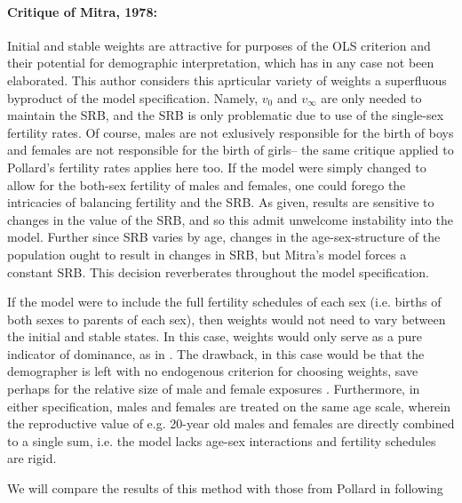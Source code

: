 \paragraph{Critique of Mitra, 1978: } Initial and stable weights are attractive
for purposes of the OLS criterion and their potential for demographic interpretation, which has in any
case not been elaborated. This author considers this aprticular variety of
weights a superfluous byproduct of the model specification. Namely, $v_0$ and
$v_\infty$ are only needed to maintain the SRB, and the SRB is
only problematic due to use of the single-sex fertility rates. Of course, males
are not exlusively responsible for the birth of boys and females are not 
responsible for the birth of girls-- the same critique applied to Pollard's
fertility rates applies here too. If the model were simply changed to allow for
the both-sex fertility of males and females, one could forego the
intricacies of balancing fertility and the SRB. As given, results are
sensitive to changes in the value of the SRB, and so this admit
unwelcome instability into the model. Further since SRB varies by age,
changes in the age-sex-structure of the population ought to result in changes in
SRB, but Mitra's model forces a constant SRB. This decision reverberates
throughout the model specification.

If the model were to include the full fertility schedules of each sex (i.e.
births of both sexes to parents of each sex), then weights would not need to
vary between the initial and stable states. In this case, weights would only serve as a pure indicator of
dominance, as in \citet{goodman1967age}. The drawback, in this case would be
that the demographer is left with no endogenous criterion for choosing weights, save
perhaps for the relative size of male and female exposures \citep{mitra1976effect}. 
Furthermore, in either specification, males and females are treated on the same 
age scale, wherein the reproductive value of e.g. 20-year old males and females are
directly combined to a single sum, i.e. the model lacks age-sex interactions
and fertility schedules are rigid. 

We will compare the results of this method with those from Pollard in following

